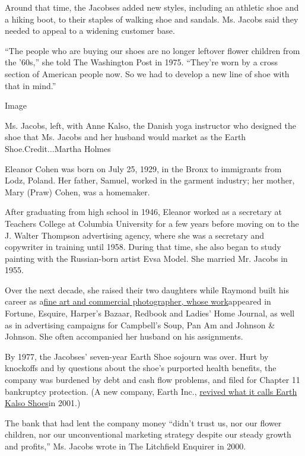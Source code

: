Around that time, the Jacobses added new styles, including an athletic
shoe and a hiking boot, to their staples of walking shoe and sandals.
Ms. Jacobs said they needed to appeal to a widening customer base.

``The people who are buying our shoes are no longer leftover flower
children from the '60s,'' she told The Washington Post in 1975.
``They're worn by a cross section of American people now. So we had to
develop a new line of shoe with that in mind.''

Image

Ms. Jacobs, left, with Anne Kalso, the Danish yoga instructor who
designed the shoe that Ms. Jacobs and her husband would market as the
Earth Shoe.Credit...Martha Holmes

Eleanor Cohen was born on July 25, 1929, in the Bronx to immigrants from
Lodz, Poland. Her father, Samuel, worked in the garment industry; her
mother, Mary (Praw) Cohen, was a homemaker.

After graduating from high school in 1946, Eleanor worked as a secretary
at Teachers College at Columbia University for a few years before moving
on to the J. Walter Thompson advertising agency, where she was a
secretary and copywriter in training until 1958. During that time, she
also began to study painting with the Russian-born artist Evsa Model.
She married Mr. Jacobs in 1955.

Over the next decade, she raised their two daughters while Raymond built
his career as
a\href{https://www.raymondjacobsphotography.com/raymond-jacobs-biography}{fine
art and commercial photographer, whose work}appeared in Fortune,
Esquire, Harper's Bazaar, Redbook and Ladies' Home Journal, as well as
in advertising campaigns for Campbell's Soup, Pan Am and Johnson \&
Johnson. She often accompanied her husband on his assignments.

By 1977, the Jacobses' seven-year Earth Shoe sojourn was over. Hurt by
knockoffs and by questions about the shoe's purported health benefits,
the company was burdened by debt and cash flow problems, and filed for
Chapter 11 bankruptcy protection. (A new company, Earth Inc.,
\href{https://earthshoes.com/pages/earth-kalso-grounded-heel-shoes}{revived
what it calls Earth Kalso Shoes}in 2001.)

The bank that had lent the company money ``didn't trust us, nor our
flower children, nor our unconventional marketing strategy despite our
steady growth and profits,'' Ms. Jacobs wrote in The Litchfield Enquirer
in 2000.

